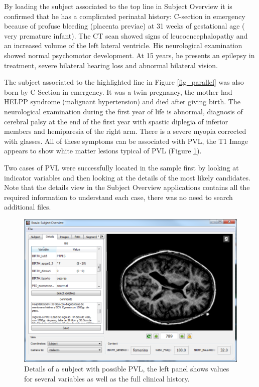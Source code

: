 \documentclass[twocolumn]{svjour3}
\begin{document}
By loading the subject associated to the top line in Subject Overview it is confirmed that he has a complicated perinatal history: C-section in emergency because of profuse bleeding (placenta previae) at 31 weeks of gestational age ( very premature infant). The  CT scan showed signs of leucoencephalopathy  and an  increased volume of the left lateral ventricle. His neurological examination showed normal psychomotor development. At 15 years, he presents an epilepsy in  treatment, severe bilateral hearing loss and abnormal bilateral vision.  

The subject associated to the highlighted line in Figure \ref{fig_parallel} was also born by C-Section in emergency. It was a twin pregnancy, the mother had HELPP syndrome (malignant hypertension) and died after giving birth. The neurological examination during the first year of life is abnormal, diagnosis of cerebral palsy at the end of the first year with spastic diplegia of inferior members and hemiparesia of the right arm.  There is a severe myopia corrected with glasses. All of these symptoms can be associated with PVL, the T1 Image appears to show white matter lesions typical of PVL (Figure \ref{fig_subject3}).

Two cases of PVL were successfully located in the sample first by looking at indicator variables and then looking at the details of the most likely candidates. Note that the details view in the Subject Overview applications contains all the required information to  understand each case, there was no need to search additional files. 

\begin{figure}
\begin{center}
\includegraphics[width=\linewidth]{figures/cases/pvl_details}
\end{center}
 \caption{\label{fig_subject3}Details of a subject with possible PVL, the left panel shows values for several variables as well as the full clinical history.}
\end{figure}
\end{document}
